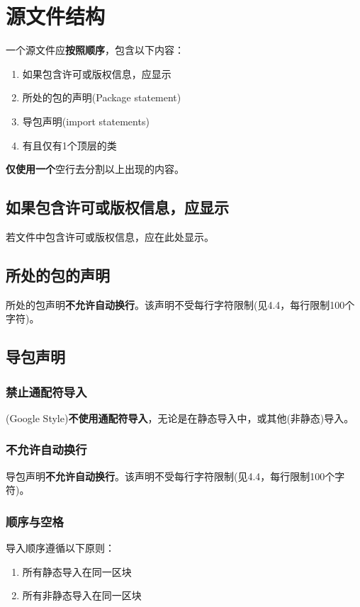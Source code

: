 \documentclass[cn,11pt,chinese]{elegantbook}
\begin{document}
\chapter{源文件结构}
一个源文件应\textbf{按照顺序}，包含以下内容：
\begin{enumerate}
	\item 如果包含许可或版权信息，应显示
	\item 所处的包的声明(Package statement)
	\item 导包声明(import statements)
	\item 有且仅有1个顶层的类
\end{enumerate}

\textbf{仅使用一个}空行去分割以上出现的内容。
\section{如果包含许可或版权信息，应显示}
若文件中包含许可或版权信息，应在此处显示。

\section{所处的包的声明}
所处的包声明\textbf{不允许自动换行}。该声明不受每行字符限制(见4.4，每行限制100个字符)。

\section{导包声明}
\subsection{禁止通配符导入}
(Google Style)\textbf{不使用通配符导入}，无论是在静态导入中，或其他(非静态)导入。

\subsection{不允许自动换行}
导包声明\textbf{不允许自动换行}。该声明不受每行字符限制(见4.4，每行限制100个字符)。

\subsection{顺序与空格}
导入顺序遵循以下原则：
\begin{enumerate}
	\item 所有静态导入在同一区块
	\item 所有非静态导入在同一区块
\end{enumerate}
\end{document}
